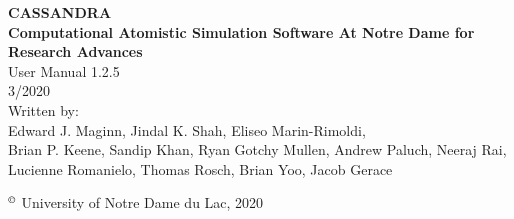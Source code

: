 \begin{center}
\vspace*{2 in}
{\huge{\bf CASSANDRA} }\\
\vspace{0.5in}
{\huge { \bf  Computational Atomistic Simulation Software At Notre Dame for Research Advances}} \\
\vspace{1 in}
User Manual 1.2.5 \\
\vspace{.2 in}
3/2020 \\
\vspace{0.2in}
Written by: \\
\vspace{0.2in}
Edward J. Maginn, Jindal K. Shah, Eliseo Marin-Rimoldi, \\
Brian P. Keene, Sandip Khan, Ryan Gotchy Mullen, Andrew Paluch,
Neeraj Rai, Lucienne Romanielo, Thomas Rosch, Brian Yoo, Jacob Gerace
\end{center}
\vspace{1.0in}
$^\copyright$ University of Notre Dame du Lac, 2020
